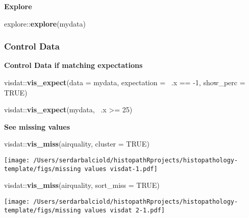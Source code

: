 \documentclass[
]{article}
\newenvironment{Shaded}{\begin{snugshade}}{\end{snugshade}}
\newcommand{\DataTypeTok}[1]{\textcolor[rgb]{0.00,0.34,0.68}{#1}}
\newcommand{\DecValTok}[1]{\textcolor[rgb]{0.69,0.50,0.00}{#1}}
\newcommand{\KeywordTok}[1]{\textcolor[rgb]{0.12,0.11,0.11}{\textbf{#1}}}
\newcommand{\NormalTok}[1]{\textcolor[rgb]{0.12,0.11,0.11}{#1}}
\newcommand{\OperatorTok}[1]{\textcolor[rgb]{0.12,0.11,0.11}{#1}}
\newcommand{\OtherTok}[1]{\textcolor[rgb]{0.00,0.43,0.16}{#1}}
\newcommand{\StringTok}[1]{\textcolor[rgb]{0.75,0.01,0.01}{#1}}
\begin{document}
\textbf{Explore}

\begin{Shaded}
\begin{Highlighting}[]
\NormalTok{explore}\OperatorTok{::}\KeywordTok{explore}\NormalTok{(mydata)}
\end{Highlighting}
\end{Shaded}

\hypertarget{control-data}{%
\subsubsection{Control Data}\label{control-data}}

\textbf{Control Data if matching expectations}

\begin{Shaded}
\begin{Highlighting}[]
\NormalTok{visdat}\OperatorTok{::}\KeywordTok{vis_expect}\NormalTok{(}\DataTypeTok{data =}\NormalTok{ mydata, }\DataTypeTok{expectation =} \OperatorTok{~}\NormalTok{.x }\OperatorTok{==}\StringTok{ }\DecValTok{-1}\NormalTok{, }\DataTypeTok{show_perc =} \OtherTok{TRUE}\NormalTok{)}

\NormalTok{visdat}\OperatorTok{::}\KeywordTok{vis_expect}\NormalTok{(mydata, }\OperatorTok{~}\NormalTok{.x }\OperatorTok{>=}\StringTok{ }\DecValTok{25}\NormalTok{)}
\end{Highlighting}
\end{Shaded}

\textbf{See missing values}

\begin{Shaded}
\begin{Highlighting}[]
\NormalTok{visdat}\OperatorTok{::}\KeywordTok{vis_miss}\NormalTok{(airquality, }\DataTypeTok{cluster =} \OtherTok{TRUE}\NormalTok{)}
\end{Highlighting}
\end{Shaded}

\texttt{[image: /Users/serdarbalciold/histopathRprojects/histopathology-template/figs/missing values visdat-1.pdf]}

\begin{Shaded}
\begin{Highlighting}[]
\NormalTok{visdat}\OperatorTok{::}\KeywordTok{vis_miss}\NormalTok{(airquality, }\DataTypeTok{sort_miss =} \OtherTok{TRUE}\NormalTok{)}
\end{Highlighting}
\end{Shaded}

\texttt{[image: /Users/serdarbalciold/histopathRprojects/histopathology-template/figs/missing values visdat 2-1.pdf]}
\end{document}

